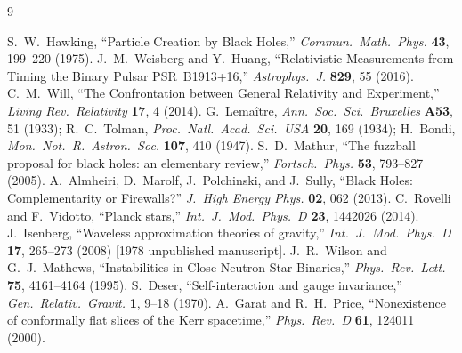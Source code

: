\documentclass[11pt]{article}
\begin{document}
\begingroup\small
\begin{thebibliography}{9}
 S.~W.~Hawking, ``Particle Creation by Black Holes,''
  \emph{Commun.\ Math.\ Phys.} \textbf{43}, 199--220 (1975).
 J.~M.~Weisberg and Y.~Huang, ``Relativistic Measurements from Timing the
  Binary Pulsar PSR~B1913+16,'' \emph{Astrophys.\ J.} \textbf{829}, 55 (2016).
 C.~M.~Will, ``The Confrontation between General Relativity and Experiment,''
  \emph{Living Rev.\ Relativity} \textbf{17}, 4 (2014).
 G.~Lema\^itre, \emph{Ann.\ Soc.\ Sci.\ Bruxelles} \textbf{A53}, 51 (1933);
  R.~C.~Tolman, \emph{Proc.\ Natl.\ Acad.\ Sci.\ USA} \textbf{20}, 169 (1934);
  H.~Bondi, \emph{Mon.\ Not.\ R.\ Astron.\ Soc.} \textbf{107}, 410 (1947).
 S.~D.~Mathur, ``The fuzzball proposal for black holes: an elementary review,''
  \emph{Fortsch.\ Phys.} \textbf{53}, 793--827 (2005).
 A.~Almheiri, D.~Marolf, J.~Polchinski, and J.~Sully, ``Black Holes:
  Complementarity or Firewalls?'' \emph{J.\ High Energy Phys.} \textbf{02}, 062 (2013).
 C.~Rovelli and F.~Vidotto, ``Planck stars,''
  \emph{Int.\ J.\ Mod.\ Phys.\ D} \textbf{23}, 1442026 (2014).
 J.~Isenberg, ``Waveless approximation theories of gravity,''
  \emph{Int.\ J.\ Mod.\ Phys.\ D} \textbf{17}, 265--273 (2008) [1978 unpublished manuscript].
 J.~R.~Wilson and G.~J.~Mathews, ``Instabilities in Close Neutron Star
  Binaries,'' \emph{Phys.\ Rev.\ Lett.} \textbf{75}, 4161--4164 (1995).
 S.~Deser, ``Self-interaction and gauge invariance,''
  \emph{Gen.\ Relativ.\ Gravit.} \textbf{1}, 9--18 (1970).
 A.~Garat and R.~H.~Price, ``Nonexistence of conformally flat slices of the
  Kerr spacetime,'' \emph{Phys.\ Rev.\ D} \textbf{61}, 124011 (2000).
\end{thebibliography}
\endgroup
\end{document}
